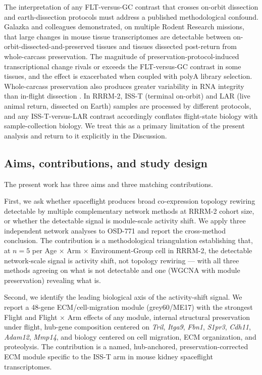 \documentclass[11pt]{article}
\newcommand{\gene}[1]{\textit{#1}}
\begin{document}
The interpretation of any FLT-versus-GC contrast that crosses on-orbit dissection and earth-dissection protocols must address a published methodological confound. Galazka and colleagues \citep{galazka2020rnaseq} demonstrated, on multiple Rodent Research missions, that large changes in mouse tissue transcriptomes are detectable between on-orbit-dissected-and-preserved tissues and tissues dissected post-return from whole-carcass preservation. The magnitude of preservation-protocol-induced transcriptional change rivals or exceeds the FLT-versus-GC contrast in some tissues, and the effect is exacerbated when coupled with polyA library selection. Whole-carcass preservation also produces greater variability in RNA integrity than in-flight dissection \citep{galazka2020rnaseq}. In RRRM-2, ISS-T (terminal on-orbit) and LAR (live animal return, dissected on Earth) samples are processed by different protocols, and any ISS-T-versus-LAR contrast accordingly conflates flight-state biology with sample-collection biology. We treat this as a primary limitation of the present analysis and return to it explicitly in the Discussion.

\subsection{Aims, contributions, and study design}

The present work has three aims and three matching contributions.

First, we ask whether spaceflight produces broad co-expression topology rewiring detectable by multiple complementary network methods at RRRM-2 cohort size, or whether the detectable signal is module-scale activity shift. We apply three independent network analyses to OSD-771 and report the cross-method conclusion. The contribution is a methodological triangulation establishing that, at $n{=}5$ per Age $\times$ Arm $\times$ Environment-Group cell in RRRM-2, the detectable network-scale signal is activity shift, not topology rewiring --- with all three methods agreeing on what is not detectable and one (WGCNA with module preservation) revealing what is.

Second, we identify the leading biological axis of the activity-shift signal. We report a 48-gene ECM/cell-migration module (grey60/ME17) with the strongest Flight and Flight $\times$ Arm effects of any module, internal structural preservation under flight, hub-gene composition centered on \gene{Tril}, \gene{Itga9}, \gene{Fbn1}, \gene{S1pr3}, \gene{Cdh11}, \gene{Adam12}, \gene{Mmp14}, and biology centered on cell migration, ECM organization, and proteolysis. The contribution is a named, hub-anchored, preservation-corrected ECM module specific to the ISS-T arm in mouse kidney spaceflight transcriptomes.
\end{document}
